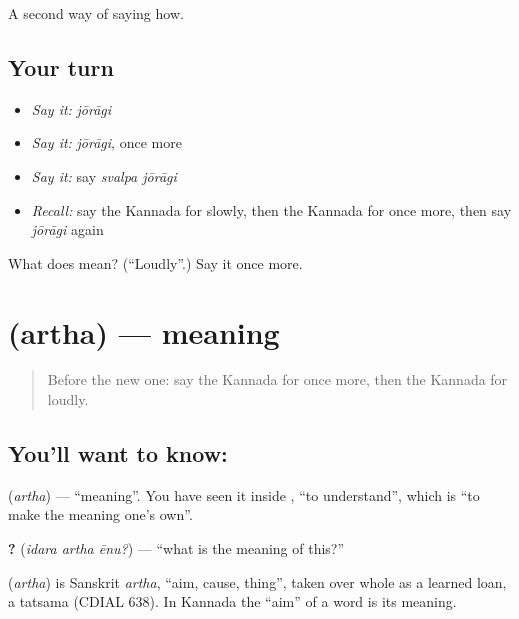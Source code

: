 \begin{grammarlens}[title={What you've built}]
A second way of saying how.
\end{grammarlens}

\subsection*{Your turn}
\begin{itemize}
\raggedright
  \item \emph{Say it:} \emph{jōrāgi}
  \item \emph{Say it:} \emph{jōrāgi}, once more
  \item \emph{Say it:} say \emph{svalpa jōrāgi}
  \item \emph{Recall:} say the Kannada for slowly, then the Kannada for once more, then say \emph{jōrāgi} again
\end{itemize}

\begin{tcolorbox}[breakable,colback=teal!4,colframe=teal!35!black,title={Before you move on}]
What does  mean? (\textquotedblleft{}Loudly\textquotedblright{}.) Say it once more.
\end{tcolorbox}
\section[\texorpdfstring{\kn{ಅರ್ಥ} (artha)}{ಅರ್ಥ (artha)}]{ (artha) — meaning}

\label{lesson:KA-C85-meaning}



\begin{quote}
Before the new one: say the Kannada for once more, then the Kannada for loudly.
\end{quote}

\subsection*{You'll want to know: }
\textbf{} (\emph{artha}) — \textquotedblleft{}meaning\textquotedblright{}. You have seen it inside \textbf{}, \textquotedblleft{}to understand\textquotedblright{}, which is \textquotedblleft{}to make the meaning one's own\textquotedblright{}.

\textbf{  ?} (\emph{idara artha ēnu?}) — \textquotedblleft{}what is the meaning of this?\textquotedblright{}

\begin{cousinweb}
\textbf{} (\emph{artha}) is Sanskrit \emph{artha}, \textquotedblleft{}aim, cause, thing\textquotedblright{}, taken over whole as a learned loan, a tatsama (CDIAL 638). In Kannada the \textquotedblleft{}aim\textquotedblright{} of a word is its meaning.
\end{cousinweb}

